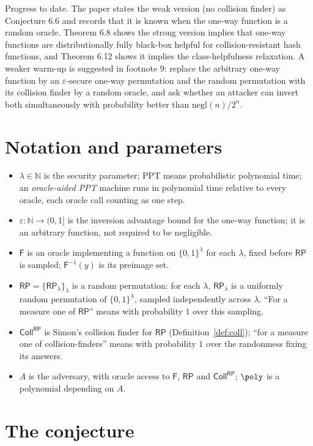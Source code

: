 \documentclass{conjura-conjecture}
\newcommand{\Fo}{\mathsf{F}}          %
\newcommand{\RP}{\mathsf{RP}}
\newcommand{\Coll}{\mathsf{Coll}}
\newcommand{\negl}{\mathrm{negl}}
\newcommand{\bits}{\{0,1\}}
\begin{document}
Progress to date. The paper states the weak version (no collision finder)
as Conjecture 6.6 and records that it is known when the one-way function is
a random oracle. Theorem 6.8 shows the strong version implies that one-way
functions are distributionally fully black-box helpful for
collision-resistant hash functions, and Theorem 6.12 shows it implies the
class-helpfulness relaxation. A weaker warm-up is suggested in footnote 9:
replace the arbitrary one-way function by an $\varepsilon$-secure one-way
permutation and the random permutation with its collision finder by a
random oracle, and ask whether an attacker can invert both simultaneously
with probability better than $\negl(n)/2^{n}$.

\section{Notation and parameters}\label{sec:notation}

\begin{itemize}
\item $\lambda\in\mathbb N$ is the security parameter; PPT means
  probabilistic polynomial time; an \emph{oracle-aided PPT} machine runs in
  polynomial time relative to every oracle, each oracle call counting as
  one step.
\item $\varepsilon:\mathbb N\to(0,1]$ is the inversion advantage bound for
  the one-way function; it is an arbitrary function, not required to be
  negligible.
\item $\Fo$ is an oracle implementing a function on $\bits^{\lambda}$ for
  each $\lambda$, fixed before $\RP$ is sampled; $\Fo^{-1}(y)$ is its
  preimage set.
\item $\RP=\{\RP_{\lambda}\}_{\lambda}$ is a random permutation: for each
  $\lambda$, $\RP_{\lambda}$ is a uniformly random permutation of
  $\bits^{\lambda}$, sampled independently across $\lambda$. ``For a
  measure one of $\RP$'' means with probability $1$ over this sampling.
\item $\Coll^{\RP}$ is Simon's collision finder for $\RP$
  (Definition~\ref{def:coll}); ``for a measure one of collision-finders''
  means with probability $1$ over the randomness fixing its answers.
\item $A$ is the adversary, with oracle access to $\Fo$, $\RP$ and
  $\Coll^{\RP}$; $\poly$ is a polynomial depending on $A$.
\end{itemize}

\section{The conjecture}\label{sec:conjectures}
\end{document}
